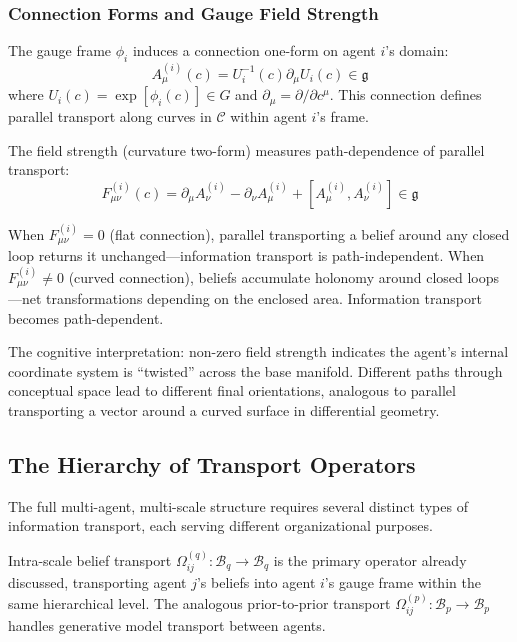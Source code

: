 \documentclass[11pt]{article}
\begin{document}
\subsubsection{Connection Forms and Gauge Field Strength}

The gauge frame $\phi_i$ induces a connection one-form on agent $i$'s domain:
\begin{equation}
A^{(i)}_\mu(c) = U_i^{-1}(c) \partial_\mu U_i(c) \in \mathfrak{g}
\end{equation}
where $U_i(c) = \exp[\phi_i(c)] \in G$ and $\partial_\mu = \partial/\partial c^\mu$. This connection defines parallel transport along curves in $\mathcal{C}$ within agent $i$'s frame.

The field strength (curvature two-form) measures path-dependence of parallel transport:
\begin{equation}
F^{(i)}_{\mu\nu}(c) = \partial_\mu A^{(i)}_\nu - \partial_\nu A^{(i)}_\mu + [A^{(i)}_\mu, A^{(i)}_\nu] \in \mathfrak{g}
\end{equation}

When $F^{(i)}_{\mu\nu} = 0$ (flat connection), parallel transporting a belief around any closed loop returns it unchanged---information transport is path-independent. When $F^{(i)}_{\mu\nu} \neq 0$ (curved connection), beliefs accumulate holonomy around closed loops---net transformations depending on the enclosed area. Information transport becomes path-dependent.

The cognitive interpretation: non-zero field strength indicates the agent's internal coordinate system is ``twisted'' across the base manifold. Different paths through conceptual space lead to different final orientations, analogous to parallel transporting a vector around a curved surface in differential geometry.

\subsection{The Hierarchy of Transport Operators}

The full multi-agent, multi-scale structure requires several distinct types of information transport, each serving different organizational purposes.

Intra-scale belief transport $\Omega^{(q)}_{ij}: \mathcal{B}_q \to \mathcal{B}_q$ is the primary operator already discussed, transporting agent $j$'s beliefs into agent $i$'s gauge frame within the same hierarchical level. The analogous prior-to-prior transport $\Omega^{(p)}_{ij}: \mathcal{B}_p \to \mathcal{B}_p$ handles generative model transport between agents.
\end{document}
